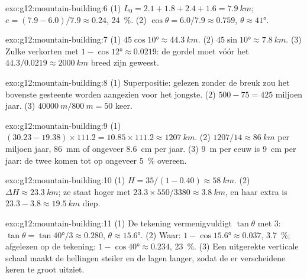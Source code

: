 \begin{solution}{exo:g12:mountain-building:6}
(1) $L_0 = 2.1 + 1.8 + 2.4 + 1.6 = \qty{7.9}{km}$;
$e = (7.9 - 6.0)/7.9 \approx 0.24$, \qty{24}{\percent}. (2) $\cos\theta =
6.0/7.9 \approx 0.759$, $\theta \approx \ang{41}$.
\end{solution}

\begin{solution}{exo:g12:mountain-building:7}
(1) $45\cos\ang{10} \approx \qty{44.3}{km}$. (2) $45\sin\ang{10} \approx
\qty{7.8}{km}$. (3) Zulke  verkorten met $1 - \cos\ang{12} \approx 0.0219$:
de gordel moet vóór het  $44.3/0.0219 \approx \qty{2000}{km}$ breed
zijn geweest.
\end{solution}

\begin{solution}{exo:g12:mountain-building:8}
(1) Superpositie: gelezen zonder de breuk zou het bovenste gesteente worden aangezien
voor het jongste. (2) $500 - 75 = 425$ miljoen jaar. (3) $\qty{40000}{m} /
\qty{800}{m} = 50$ keer.
\end{solution}

\begin{solution}{exo:g12:mountain-building:9}
(1) $(30.23 - 19.38) \times 111.2 = 10.85 \times 111.2 \approx
\qty{1207}{km}$. (2) $1207/14 \approx \qty{86}{km}$ per miljoen jaar,
\qty{86}{mm} of ongeveer \qty{8.6}{cm} per jaar. (3) \qty{9}{m} per eeuw is
\qty{9}{cm} per jaar: de twee komen tot op ongeveer \qty{5}{\percent} overeen.
\end{solution}

\begin{solution}{exo:g12:mountain-building:10}
(1) $H = 35/(1 - 0.40) \approx \qty{58}{km}$. (2) $\Delta H \approx
\qty{23.3}{km}$; ze staat hoger met $23.3 \times 550/3380 \approx
\qty{3.8}{km}$, en haar extra  is $23.3 - 3.8 \approx \qty{19.5}{km}$ diep.
\end{solution}

\begin{solution}{exo:g12:mountain-building:11}
(1) De tekening vermenigvuldigt $\tan\theta$ met 3: $\tan\theta = \tan\ang{40}/3
\approx 0.280$, $\theta \approx \ang{15.6}$. (2) Waar: $1 - \cos\ang{15.6}
\approx 0.037$, \qty{3.7}{\percent}; afgelezen op de tekening: $1 - \cos\ang{40}
\approx 0.234$, \qty{23}{\percent}. (3) Een uitgerekte verticale schaal maakt
de hellingen steiler en de lagen langer, zodat de  er verscheidene
keren te groot uitziet.
\end{solution}

